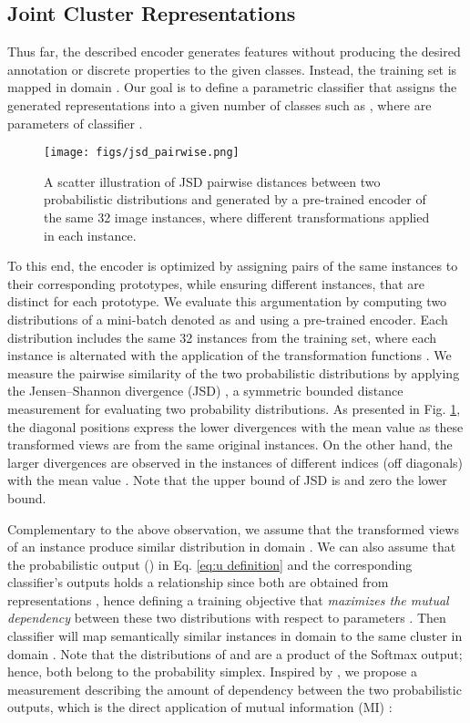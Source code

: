 \documentclass[journal]{IEEEtran}
\begin{document}
\subsection{Joint Cluster Representations}

Thus far, the described encoder generates features without producing the desired annotation or discrete properties to the given  classes. Instead, the training set is mapped in domain . Our goal is to define a parametric classifier that assigns the generated representations into a given number of classes  such as , where  are parameters of classifier .\par

\begin{figure}[t]
    \centering
    \texttt{[image: figs/jsd\_pairwise.png]}
    \caption{A scatter illustration of JSD pairwise distances between two probabilistic distributions  and  generated by a pre-trained encoder of the same 32 image instances, where different transformations applied in each instance.
    }
    \label{fig:scatter similarities}
\end{figure}
To this end, the encoder is optimized by assigning pairs of the same instances to their corresponding prototypes, while ensuring different instances, that are distinct for each prototype. We evaluate this argumentation by computing two distributions of a mini-batch denoted as  and  using a pre-trained encoder. Each distribution includes the same 32 instances from the training set, where each instance is alternated with the application of the transformation functions . We measure the pairwise similarity of the two probabilistic distributions by applying the Jensen–Shannon divergence (JSD) \cite{1365067}, a symmetric bounded distance measurement for evaluating two probability distributions. As presented in Fig. \ref{fig:scatter similarities}, the diagonal positions express the lower divergences with the mean value  as these transformed views are from the same original instances. On the other hand, the larger divergences are observed in the instances of different indices (off diagonals) with the mean value . Note that the upper bound of JSD is  and zero the lower bound. \par

Complementary to the above observation, we assume that the transformed views of an instance produce similar distribution in domain . We can also assume that the probabilistic output () in Eq. \ref{eq:u definition} and the corresponding classifier's outputs  holds a relationship since both are obtained from representations , hence defining a training objective that \textit{maximizes the mutual dependency} between these two distributions with respect to parameters . Then classifier  will map semantically similar instances in domain  to the same cluster in domain . Note that the distributions of  and  are a product of the Softmax output; hence, both belong to the probability simplex. Inspired by \cite{Ji_2019_ICCV}, we propose a measurement describing the amount of dependency between the two probabilistic outputs, which is the direct application of mutual information (MI) \cite{Cover:1991:EIT:129837}:
\end{document}
